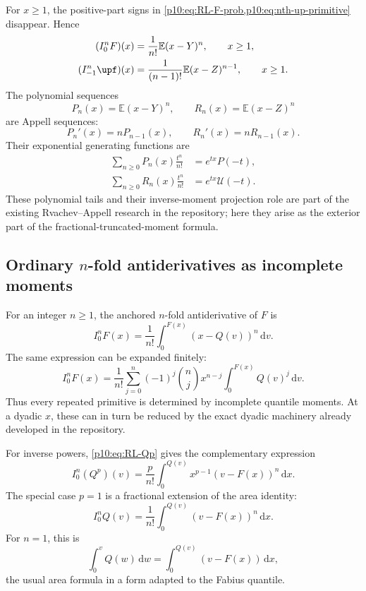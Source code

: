 \documentclass[11pt,oneside]{article}
\theoremstyle{definition}
\theoremstyle{remark}
\newcommand{\F}{F}
\newcommand{\Q}{Q}
\newcommand{\E}{\mathbb E}
\newcommand{\dd}{\,\mathrm d}
\newcommand{\1}{\mathbf 1}
\begin{document}
For \(x\ge1\), the positive-part signs in \cref{p10:eq:RL-F-prob,p10:eq:nth-up-primitive}
disappear.  Hence
\begin{align}
 (I_0^n\F)(x)&=\frac1{n!}\E(x-Y)^n,\qquad x\ge1,
 \label{p10:eq:F-Appell-tail}\\
 (I_{-1}^n\upf)(x)&=\frac1{(n-1)!}\E(x-Z)^{n-1},\qquad x\ge1.
 \label{p10:eq:up-Appell-tail}
\end{align}
The polynomial sequences
\begin{equation}\label{p10:eq:Appell-polynomials}
 P_n(x)=\E(x-Y)^n,
 \qquad R_n(x)=\E(x-Z)^n
\end{equation}
are Appell sequences:
\begin{equation}\label{p10:eq:Appell-derivative}
 P_n'(x)=nP_{n-1}(x),\qquad R_n'(x)=nR_{n-1}(x).
\end{equation}
Their exponential generating functions are
\begin{align}
 \sum_{n\ge0}P_n(x)\frac{t^n}{n!}
 &=e^{tx}P(-t),\label{p10:eq:Pn-egf}\\
 \sum_{n\ge0}R_n(x)\frac{t^n}{n!}
 &=e^{tx}\mathcal U(-t).\label{p10:eq:Rn-egf}
\end{align}
These polynomial tails and their inverse-moment projection role are part of the existing
Rvachev--Appell research in the repository; here they arise as the exterior part of the
fractional-truncated-moment formula.

\subsection{Ordinary \(n\)-fold antiderivatives as incomplete moments}

For an integer \(n\ge1\), the anchored \(n\)-fold antiderivative of \(\F\) is
\begin{equation}\label{p10:eq:nth-F-primitive}
 I_0^n\F(x)=\frac1{n!}
 \int_0^{\F(x)}(x-\Q(v))^n\dd v.
\end{equation}
The same expression can be expanded finitely:
\begin{equation}\label{p10:eq:nth-F-incomplete-moments}
 I_0^n\F(x)
 =\frac1{n!}\sum_{j=0}^n(-1)^j\binom njx^{n-j}
 \int_0^{\F(x)}\Q(v)^j\dd v.
\end{equation}
Thus every repeated primitive is determined by incomplete quantile moments.  At a dyadic
\(x\), these can in turn be reduced by the exact dyadic machinery already developed in
the repository.

For inverse powers, \cref{p10:eq:RL-Qp} gives the complementary expression
\begin{equation}\label{p10:eq:nth-Q-primitive}
 I_0^n(\Q^p)(v)
 =\frac{p}{n!}\int_0^{\Q(v)}x^{p-1}(v-\F(x))^n\dd x.
\end{equation}
The special case \(p=1\) is a fractional extension of the area identity:
\begin{equation}\label{p10:eq:nth-Q-area}
 I_0^n\Q(v)=\frac1{n!}\int_0^{\Q(v)}(v-\F(x))^n\dd x.
\end{equation}
For \(n=1\), this is
\begin{equation}\label{p10:eq:classic-inverse-area}
 \int_0^v\Q(w)\dd w=\int_0^{\Q(v)}(v-\F(x))\dd x,
\end{equation}
the usual area formula in a form adapted to the Fabius quantile.
\end{document}
